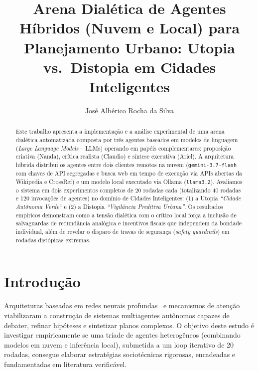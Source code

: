 \documentclass[runningheads]{llncs}
\begin{document}
\title{Arena Dial\'etica de Agentes H\'ibridos (Nuvem e Local) para Planejamento Urbano: Utopia vs.\ Distopia em Cidades Inteligentes}

\author{Jos\'e Alb\'erico Rocha da Silva}

\maketitle

\begin{abstract}
Este trabalho apresenta a implementa\c{c}\~ao e a an\'alise experimental de uma arena dial\'etica automatizada composta por tr\^es agentes baseados em modelos de linguagem (\emph{Large Language Models} -- LLMs) operando em pap\'eis complementares: proposi\c{c}\~ao criativa (Nanda), cr\'itica realista (Claudio) e s\'intese executiva (Ariel). A arquitetura h\'ibrida distribui os agentes entre dois clientes remotos na nuvem (\texttt{gemini-3.7-flash} com chaves de API segregadas e busca web em tempo de execu\c{c}\~ao via APIs abertas da Wikipedia e CrossRef) e um modelo local executado via Ollama (\texttt{llama3.2}). Avaliamos o sistema em dois experimentos completos de 20 rodadas cada (totalizando 40 rodadas e 120 invoca\c{c}\~oes de agentes) no dom\'inio de Cidades Inteligentes: (1) a Utopia \emph{``Cidade Aut\^onoma Verde''} e (2) a Distopia \emph{``Vigil\^ancia Preditiva Urbana''}. Os resultados emp\'iricos demonstram como a tens\~ao dial\'etica com o cr\'itico local for\c{c}a a inclus\~ao de salvaguardas de redund\^ancia anal\'ogica e incentivos fiscais que independem da bondade individual, al\'em de revelar o disparo de travas de seguran\c{c}a (\emph{safety guardrails}) em rodadas dist\'opicas extremas.
\end{abstract}

\section{Introdu\c{c}\~ao}
Arquiteturas baseadas em redes neurais profundas~\cite{goodfellow2016deep} e mecanismos de aten\c{c}\~ao~\cite{vaswani2017attention} viabilizaram a constru\c{c}\~ao de sistemas multiagentes aut\^onomos capazes de debater, refinar hip\'oteses e sintetizar planos complexos. O objetivo deste estudo \'e investigar empiricamente se uma tr\'iade de agentes heterog\^eneos (combinando modelos em nuvem e infer\^encia local), submetida a um loop iterativo de 20 rodadas, consegue elaborar estrat\'egias sociot\'ecnicas rigorosas, encadeadas e fundamentadas em literatura verific\'avel.
\end{document}
